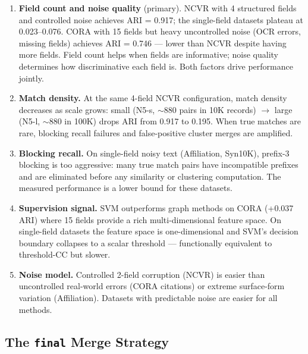 \documentclass[11pt, a4paper]{article}
\begin{document}
\begin{enumerate}[leftmargin=*, label=\arabic*.]
  \item \textbf{Field count and noise quality} (primary). NCVR with 4 structured fields
        and controlled noise achieves ARI = 0.917; the single-field datasets plateau at
        0.023--0.076. CORA with 15 fields but heavy uncontrolled noise (OCR errors,
        missing fields) achieves ARI = 0.746 --- lower than NCVR despite having more
        fields. Field count helps when fields are informative; noise quality determines
        how discriminative each field is. Both factors drive performance jointly.

  \item \textbf{Match density.} At the same 4-field NCVR configuration, match density
        decreases as scale grows: small (N5-s, $\sim$880 pairs in 10K records) $\to$
        large (N5-l, $\sim$880 in 100K) drops ARI from 0.917 to 0.195. When true
        matches are rare, blocking recall failures and false-positive cluster merges
        are amplified.

  \item \textbf{Blocking recall.} On single-field noisy text (Affiliation, Syn10K),
        prefix-3 blocking is too aggressive: many true match pairs have incompatible
        prefixes and are eliminated before any similarity or clustering computation.
        The measured performance is a lower bound for these datasets.

  \item \textbf{Supervision signal.} SVM outperforms graph methods on CORA (+0.037 ARI)
        where 15 fields provide a rich multi-dimensional feature space. On single-field
        datasets the feature space is one-dimensional and SVM's decision boundary
        collapses to a scalar threshold --- functionally equivalent to threshold-CC but
        slower.

  \item \textbf{Noise model.} Controlled 2-field corruption (NCVR) is easier than
        uncontrolled real-world errors (CORA citations) or extreme surface-form variation
        (Affiliation). Datasets with predictable noise are easier for all methods.
\end{enumerate}

\subsection{The \texttt{final} Merge Strategy}
\end{document}
